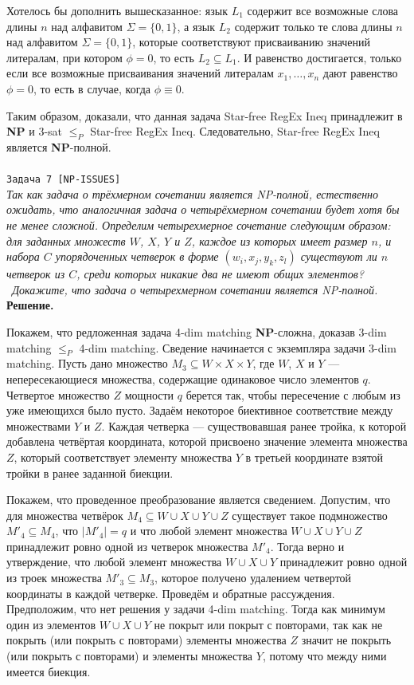 \documentclass[10pt]{article}
\begin{document}
\medskip\par Хотелось бы дополнить вышесказанное: язык $L_1$ содержит все возможные слова длины $n$ над алфавитом $\Sigma=\{0, 1\}$, а язык $L_2$ содержит только те слова  длины $n$ над алфавитом $\Sigma=\{0, 1\}$, которые соответствуют присваиванию значений литералам, при котором $\phi = 0$, то есть $L_2\subseteq L_1$. И равенство достигается, только если все возможные присваивания значений литералам $x_1, \dots, x_n$ дают равенство $\phi =0$, то есть в случае, когда $\phi \equiv 0$.
\medskip\par Таким образом, доказали, что данная задача Star-free RegEx Ineq принадлежит в \textbf{NP} и $3$-sat $\leq_P$ Star-free RegEx Ineq. Следовательно, Star-free RegEx Ineq является \textbf{NP}-полной.
\ \\[0.5 cm]
\hline
\ \\[0.5 cm]
{\large\texttt{Задача 7 [NP-ISSUES]}}
\ \\[0.1cm]
\textit{
Так как задача о трёхмерном сочетании является NP-полной, естественно ожидать, что аналогичная задача о четырёхмерном сочетании будет хотя бы не менее сложной. Определим четырехмерное сочетание следующим образом: для заданных множеств $W$, $X$, $Y$ и $Z$, каждое из которых имеет размер $n$, и набора $C$ упорядоченных четверок в форме $(w_i, x_j, y_k , z_l)$ существуют ли $n$ четверок из $C$, среди которых никакие два не имеют общих элементов?
\\ \
Докажите, что задача о четырехмерном сочетании является NP-полной.
}
\ \\[0.3cm]
\textbf{Решение.} 
\medskip\par 
Покажем, что редложенная задача 4-dim matching \textbf{NP}-сложна, доказав 3-dim matching $\leq_P$ 4-dim matching. Сведение начинается с экземпляра задачи 3-dim matching. Пусть дано множество  $M_3 \subseteq W\times X\times Y$, где $W$, $X$ и $Y$ --- непересекающиеся множества, содержащие одинаковое число элементов $q$. Четвертое множество $Z$ мощности $q$ берется так, чтобы пересечение с любым из уже имеющихся было пусто. Задаём некоторое биективное соответствие между множествами $Y$ и $Z$. Каждая четверка --- существовавшая ранее тройка, к которой добавлена четвёртая координата, которой присвоено значение элемента множества $Z$, который соответствует элементу множества $Y$ в третьей координате взятой тройки в ранее заданной биекции.
\medskip\par Покажем, что проведенное преобразование является сведением. Допустим, что для множества четвёрок $M_4\subseteq W\cup X\cup Y\cup Z$ существует такое подмножество $M'_4\subseteq M_4$, что $|M'_4|=q$ и что любой элемент множества $W\cup X\cup Y\cup Z$ принадлежит ровно одной из четверок множества $M'_4$. Тогда верно и утверждение, что любой элемент множества $W\cup X\cup Y$ принадлежит ровно одной из троек множества $M'_3\subseteq M_3$, которое получено удалением четвертой координаты в каждой четверке. Проведём и обратные рассуждения. Предположим, что нет решения у задачи 4-dim matching. Тогда как минимум один из элементов $W\cup X\cup Y$ не покрыт или покрыт с повторами, так как не покрыть (или покрыть с повторами) элементы множества $Z$ значит не покрыть (или покрыть с повторами) и элементы множества $Y$, потому что между ними имеется биекция.
\end{document}
